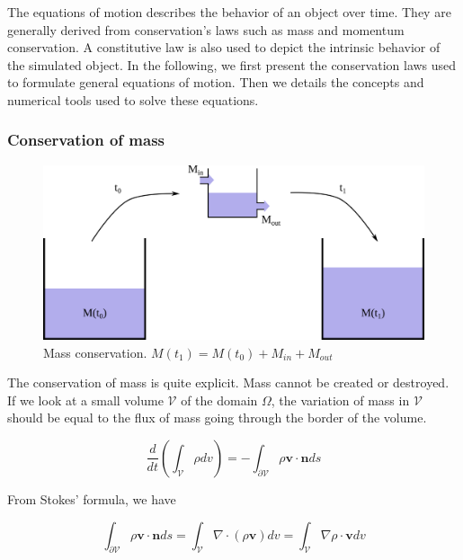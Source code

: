 The equations of motion describes the behavior of an object over time.
They are generally derived from conservation's laws such as mass and momentum conservation. 
A constitutive law is also used to depict the intrinsic behavior of the simulated object.
In the following, we first present the conservation laws used to formulate general equations of motion.
Then we details the concepts and numerical tools used to solve these equations.

\subsubsection{Conservation of mass}

\begin{figure}[!h]
\centering
\includegraphics[scale=0.8]{images/continuum_mechanics/massConservation.png}
\caption[STAR mechanics: Mass conservation]{\label{fig:massConservation} Mass conservation. $M(t_{1}) = M(t_{0}) + M_{in} + M_{out}$}
\end{figure}

The conservation of mass is quite explicit. Mass cannot be created or destroyed. If we look at a small volume $\mathcal{V}$ of the domain $\Omega$, the variation of mass in $\mathcal{V}$ should be equal to the flux of mass going through the border of the volume.

\begin{equation}
    \label{eq:massConservation}
    \displaystyle 
    \frac{d}{dt}\left( \int_{\mathcal{V}} \rho dv \right)
    =
    - \int_{\mathcal{\partial V}}\rho \mathbf{v} \cdot \mathbf{n} ds
\end{equation}

From Stokes' formula, we have

\begin{equation}
\displaystyle 
\int_{\partial \mathcal{V}} \rho \mathbf{v} \cdot \mathbf{n} ds =
\int_{\mathcal{V}} \nabla \cdot \left( \rho \mathbf{v} \right) dv =
\int_{\mathcal{V}} \nabla \rho \cdot \mathbf{v} dv
\end{equation}

